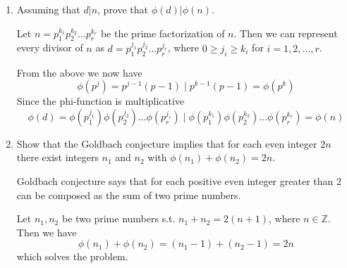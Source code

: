 \documentclass[12pt]{exam}
\theoremstyle{definition}
\begin{document}
\begin{enumerate}
\begin{enumerate}
          \end{enumerate}

          \setcounter{enumi}{12}
    \item Assuming that $d | n$, prove that $\phi(d) | \phi(n)$.
          \begin{answer}
              Let $n = p^{k_1}_1 p^{k_2}_2 \dots p^{k_r}_r$ be the prime factorization of $n$.
              Then we can represent every divisor of $n$ as $d = p^{j_1}_1 p^{j_2}_2 \dots p^{j_r}_r$, where $0 \geq j_i \geq k_i$ for $i = 1, 2, \dots, r$.

              From the above we now have
              \[
                  \phi(p^j) = p^{j-1}(p-1) \;|\; p^{k-1}(p-1) = \phi(p^k)
              \]
              Since the phi-function is multiplicative
              \[
                  \phi(d) = \phi(p^{j_1}_1) \phi(p^{j_2}_2) \dots \phi(p^{j_r}_r) \;|\; \phi(p^{k_1}_1) \phi(p^{k_2}_2) \dots \phi(p^{k_r}_r) = \phi(n)
              \]
          \end{answer}

          \setcounter{enumi}{15}
    \item Show that the Goldbach conjecture implies that for each even integer $2n$ there exist
          integers $n_1$ and $n_2$ with $\phi(n_1) + \phi(n_2) = 2n$.
          \begin{answer}
              Goldbach conjecture says that for each positive even integer greater
              than $2$ can be composed as the sum of two prime numbers.

              Let $n_1, n_2$ be two prime numbers s.t. $n_1 + n_2 = 2(n + 1)$, where $n \in \mathbb{Z}$.
              Then we have
              \[
                  \phi(n_1) + \phi(n_2) = (n_1 - 1) + (n_2 - 1) = 2n
              \]
              which solves the problem.
          \end{answer}

\end{enumerate}
\end{document}
